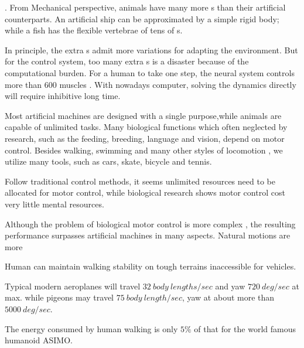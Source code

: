 \begin{itemize}
.
From Mechanical perspective, animals have many more {\dof}s than their artificial counterparts.
An artificial ship can be approximated by a simple rigid body; while a fish has the flexible vertebrae of tens of {\dof}s.


In principle, the extra {\dof}s admit more variations for adapting the environment. 
But for the control system, too many extra {\dof}s is a disaster because of the computational burden. 
For a human to take one step,  the neural system controls more than $600$ muscles .
With nowadays computer, solving the dynamics directly will require inhibitive long time.

 
Most artificial machines are designed with a single purpose,while animals are capable  of unlimited tasks.
Many biological functions which often neglected by \cms research, such as the feeding, breeding, language and vision, depend on motor control. 
Besides walking, swimming and many other styles of locomotion , we utilize many tools, such as cars, skate, bicycle and tennis.

Follow traditional control methods, it seems unlimited resources need to be  allocated for motor control, while biological research shows motor control cost very little mental resources.

Although the problem of biological motor control is more complex , the resulting performance surpasses artificial machines in many aspects.
Natural motions are more
\begin{enumerate} 

Human can maintain walking stability on tough terrains inaccessible for vehicles.

Typical modern aeroplanes will travel $32\: body\: lengths/sec$ and yaw $720\: deg/sec$ at max.
while pigeons may travel $75 \:body\: length / sec$, yaw at about more than $5000 \: deg/sec$.

The energy consumed by human walking is only $5\%$ of that for the world famous humanoid ASIMO.
\end{enumerate}

\end{itemize}



